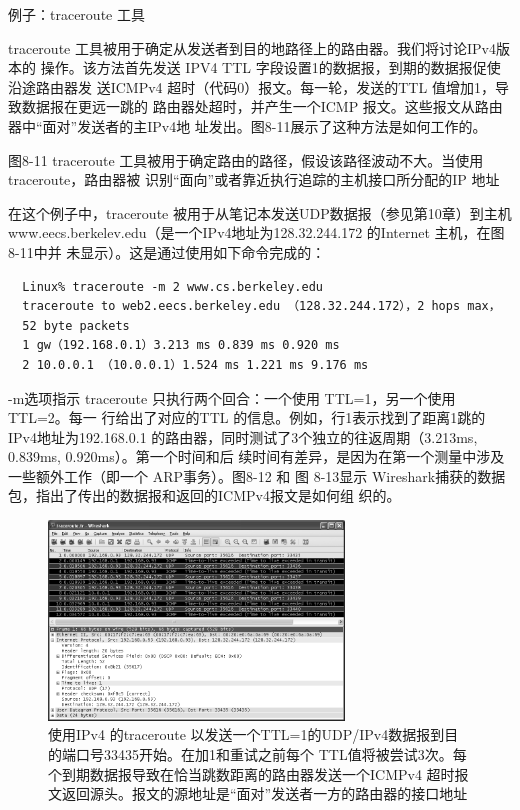 例子：traceroute 工具

traceroute 工具被用于确定从发送者到目的地路径上的路由器。我们将讨论IPv4版本的
操作。该方法首先发送 IPV4 TTL 字段设置1的数据报，到期的数据报促使沿途路由器发
送ICMPv4 超时（代码0）报文。每一轮，发送的TTL 值增加1，导致数据报在更远一跳的
路由器处超时，并产生一个ICMP 报文。这些报文从路由器中“面对”发送者的主IPv4地
址发出。图8-11展示了这种方法是如何工作的。

图8-11
traceroute 工具被用于确定路由的路径，假设该路径波动不大。当使用 traceroute，路由器被
识别“面向”或者靠近执行追踪的主机接口所分配的IP 地址

在这个例子中，traceroute 被用于从笔记本发送UDP数据报（参见第10章）到主机
www.eecs.berkelev.edu（是一个IPv4地址为128.32.244.172 的Internet 主机，在图8-11中并
未显示）。这是通过使用如下命令完成的：

\begin{verbatim}
  Linux% traceroute -m 2 www.cs.berkeley.edu
  traceroute to web2.eecs.berkeley.edu （128.32.244.172），2 hops max，
  52 byte packets
  1 gw（192.168.0.1）3.213 ms 0.839 ms 0.920 ms
  2 10.0.0.1 （10.0.0.1）1.524 ms 1.221 ms 9.176 ms
\end{verbatim}

-m选项指示 traceroute 只执行两个回合：一个使用 TTL=1，另一个使用TTL=2。每一
行给出了对应的TTL 的信息。例如，行1表示找到了距离1跳的IPv4地址为192.168.0.1
的路由器，同时测试了3个独立的往返周期（3.213ms, 0.839ms, 0.920ms）。第一个时间和后
续时间有差异，是因为在第一个测量中涉及一些额外工作（即一个 ARP事务）。图8-12 和
图 8-13显示 Wireshark捕获的数据包，指出了传出的数据报和返回的ICMPv4报文是如何组
织的。

\begin{figure}[!htb]
  \centering
  \includegraphics[width=0.7\textwidth]{imgs/8/8-12.png}
  \caption{使用IPv4 的traceroute
    以发送一个TTL=1的UDP/IPv4数据报到目的端口号33435开始。在加1和重试之前每个
  TTL值将被尝试3次。每个到期数据报导致在恰当跳数距离的路由器发送一个ICMPv4 超时报文返回源头。报文的源地址是“面对”发送者一方的路由器的接口地址}
\end{figure}

